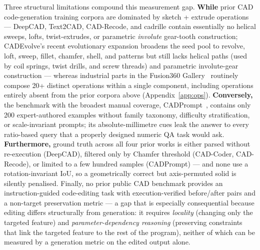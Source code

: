 \documentclass{article}
\begin{document}
Three structural limitations compound this measurement gap. \textbf{While} prior CAD code-generation training corpora are dominated by sketch + extrude operations --- DeepCAD, Text2CAD, CAD-Recode, and cadrille contain essentially no helical sweeps, lofts, twist-extrudes, or parametric \emph{involute} gear-tooth construction; CADEvolve's recent evolutionary expansion broadens the seed pool to revolve, loft, sweep, fillet, chamfer, shell, and patterns but still lacks helical paths (used by coil springs, twist drills, and screw threads) and parametric involute-gear construction --- whereas industrial parts in the Fusion360 Gallery~\citep{Willis2021fusion} routinely compose 20+ distinct operations within a single component, including operations entirely absent from the prior corpora above (Appendix~\ref{app:ops}). \textbf{Conversely,} the benchmark with the broadest manual coverage, CADPrompt~\citep{Alrashedy2025}, contains only 200 expert-authored examples without family taxonomy, difficulty stratification, or scale-invariant prompts; its absolute-millimetre cues leak the answer to every ratio-based query that a properly designed numeric QA task would ask. \textbf{Furthermore,} ground truth across all four prior works is either parsed without re-execution (DeepCAD), filtered only by Chamfer threshold (CAD-Coder, CAD-Recode), or limited to a few hundred samples (CADPrompt) --- and none use a rotation-invariant IoU, so a geometrically correct but axis-permuted solid is silently penalised. Finally, no prior public CAD benchmark provides an instruction-guided code-editing task with execution-verified before/after pairs and a non-target preservation metric --- a gap that is especially consequential because editing differs structurally from generation: it requires \emph{locality} (changing only the targeted feature) and \emph{parameter-dependency reasoning} (preserving constraints that link the targeted feature to the rest of the program), neither of which can be measured by a generation metric on the edited output alone.
\end{document}
